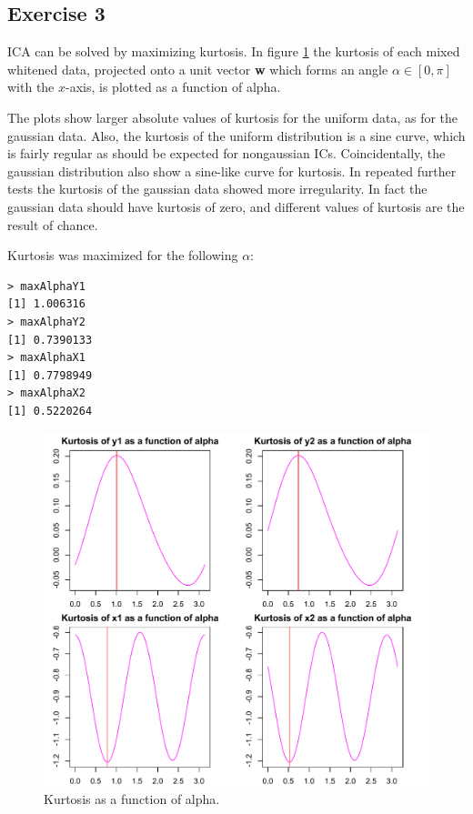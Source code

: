 \documentclass{article}
\begin{document}
\subsection{Exercise 3}
ICA can be solved by maximizing kurtosis. In figure
\ref{fig:kurtosisAlphaE23} the kurtosis of each mixed whitened
data, projected onto a unit vector \textbf{w} which forms an angle
$\alpha \in [0,\pi]$ with the $x$-axis, is plotted as a function of
alpha. 

The plots show larger absolute values of kurtosis for the uniform data, as for
the gaussian data. Also, the kurtosis of the uniform distribution is a
sine curve, which is fairly regular as should be expected for
nongaussian ICs. Coincidentally, the gaussian distribution also show a
sine-like curve for kurtosis. In repeated further tests the kurtosis
of the gaussian data showed more irregularity. In fact the gaussian
data should have kurtosis of zero, and different values of kurtosis
are the result of chance.

Kurtosis was maximized for the following $\alpha$:
\begin{verbatim}
> maxAlphaY1
[1] 1.006316
> maxAlphaY2
[1] 0.7390133
> maxAlphaX1
[1] 0.7798949
> maxAlphaX2
[1] 0.5220264
\end{verbatim}
\begin{figure}\centering
	\includegraphics[totalheight=0.5\textheight]{kurtosisAlphaE23.pdf}
	\caption{Kurtosis as a function of alpha.} \label{fig:kurtosisAlphaE23}
\end{figure}
\end{document}
